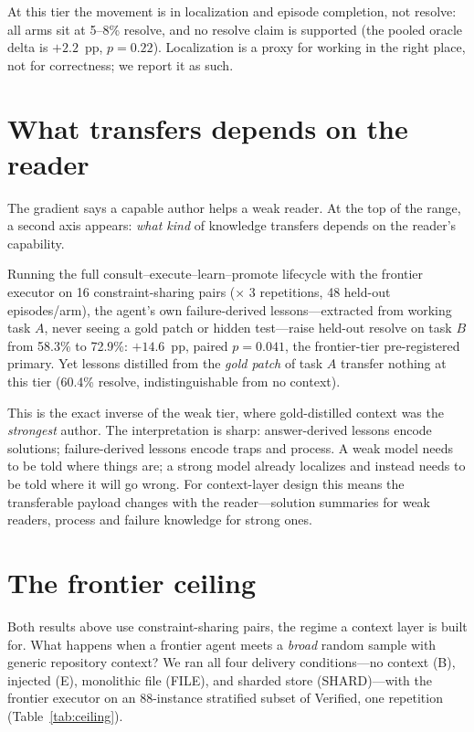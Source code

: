 \documentclass[sigconf,nonacm]{acmart}
\begin{document}
At this tier the movement is in localization and episode completion, not resolve:
all arms sit at 5--8\% resolve, and no resolve claim is supported (the pooled
oracle delta is $+2.2$~pp, $p=0.22$). Localization is a proxy for working in the
right place, not for correctness; we report it as such.

\section{What transfers depends on the reader}\label{sec:whattransfers}
The gradient says a capable author helps a weak reader. At the top of the range,
a second axis appears: \emph{what kind} of knowledge transfers depends on the
reader's capability.

Running the full consult--execute--learn--promote lifecycle with the frontier
executor on 16 constraint-sharing pairs ($\times$ 3 repetitions, 48 held-out
episodes/arm), the agent's own failure-derived lessons---extracted from working
task $A$, never seeing a gold patch or hidden test---raise held-out resolve on
task $B$ from 58.3\% to 72.9\%: $+14.6$~pp, paired $p=0.041$, the frontier-tier
pre-registered primary. Yet lessons distilled from the \emph{gold patch} of task
$A$ transfer nothing at this tier (60.4\% resolve, indistinguishable from no
context).

This is the exact inverse of the weak tier, where gold-distilled context was the
\emph{strongest} author. The interpretation is sharp: answer-derived lessons
encode solutions; failure-derived lessons encode traps and process. A weak model
needs to be told where things are; a strong model already localizes and instead
needs to be told where it will go wrong. For context-layer design this means the
transferable payload changes with the reader---solution summaries for weak
readers, process and failure knowledge for strong ones.

\section{The frontier ceiling}\label{sec:ceiling}
Both results above use constraint-sharing pairs, the regime a context layer is
built for. What happens when a frontier agent meets a \emph{broad} random sample
with generic repository context? We ran all four delivery conditions---no context
(B), injected (E), monolithic file (FILE), and sharded store (SHARD)---with the
frontier executor on an 88-instance stratified subset of Verified, one repetition
(Table~\ref{tab:ceiling}).
\end{document}

